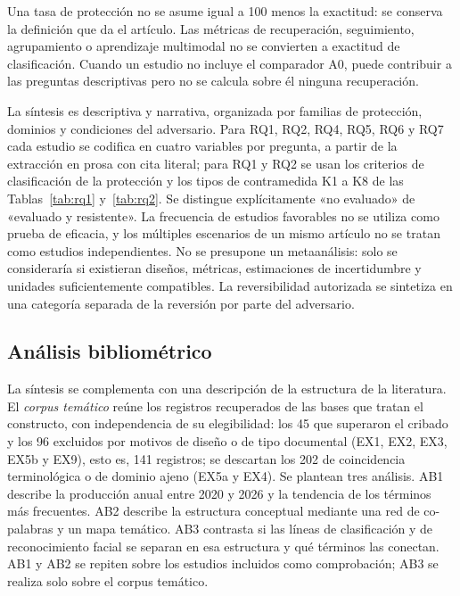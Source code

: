 \documentclass[pdflatex,sn-mathphys-num]{sn-jnl}
\theoremstyle{thmstyleone}
\theoremstyle{thmstyletwo}
\theoremstyle{thmstylethree}
\begin{document}
Una tasa de protección no se asume igual a 100 menos la exactitud: se conserva la definición que da el artículo. Las métricas de recuperación, seguimiento, agrupamiento o aprendizaje multimodal no se convierten a exactitud de clasificación. Cuando un estudio no incluye el comparador A0, puede contribuir a las preguntas descriptivas pero no se calcula sobre él ninguna recuperación.

La síntesis es descriptiva y narrativa, organizada por familias de protección, dominios y condiciones del adversario. Para RQ1, RQ2, RQ4, RQ5, RQ6 y RQ7 cada estudio se codifica en cuatro variables por pregunta, a partir de la extracción en prosa con cita literal; para RQ1 y RQ2 se usan los criterios de clasificación de la protección y los tipos de contramedida K1 a K8 de las Tablas~\ref{tab:rq1} y~\ref{tab:rq2}. Se distingue explícitamente «no evaluado» de «evaluado y resistente». La frecuencia de estudios favorables no se utiliza como prueba de eficacia, y los múltiples escenarios de un mismo artículo no se tratan como estudios independientes. No se presupone un metaanálisis: solo se consideraría si existieran diseños, métricas, estimaciones de incertidumbre y unidades suficientemente compatibles. La reversibilidad autorizada se sintetiza en una categoría separada de la reversión por parte del adversario.

\subsection{Análisis bibliométrico}\label{sec:bibliometria}

La síntesis se complementa con una descripción de la estructura de la literatura. El \emph{corpus temático} reúne los registros recuperados de las bases que tratan el constructo, con independencia de su elegibilidad: los 45 que superaron el cribado y los 96 excluidos por motivos de diseño o de tipo documental (EX1, EX2, EX3, EX5b y EX9), esto es, 141 registros; se descartan los 202 de coincidencia terminológica o de dominio ajeno (EX5a y EX4). Se plantean tres análisis. AB1 describe la producción anual entre 2020 y 2026 y la tendencia de los términos más frecuentes. AB2 describe la estructura conceptual mediante una red de co-palabras y un mapa temático. AB3 contrasta si las líneas de clasificación y de reconocimiento facial se separan en esa estructura y qué términos las conectan. AB1 y AB2 se repiten sobre los estudios incluidos como comprobación; AB3 se realiza solo sobre el corpus temático.
\end{document}
